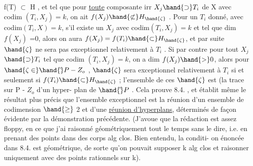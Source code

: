  f(T) $\subset$ H , et tel que pour \uline{toute} composante irr $X_j \hand{\supset} T_i$ de X
avec codim $(T_i,X_j)=k$, on ait $f(X_j)\hand{\not\subset} H_{\hand{\zeta}}$ . Pour un $T_i$ donné,
 avec codim$(T_i,X)=k$, s'il existe un $X_j$ avec codim$(T_i,X_j)=k$
et tel que dim $f(X_j)$ =0, alors 
 on aura $f(X_j) = f(T_i) \hand{\subset} H_{\hand{\zeta}}$, et par suite $\hand{\zeta}$ ne
sera pas exceptionnel relativement à $T_i$ . Si par contre pour tout $X_j$
$\hand{\supset} T_i$ tel que codim $(T_i,X_j) = k$, on a dim $f(X_j) \hand{>} 0$, alors pour
$\hand{\zeta \in} \hand{\check{}}P - Z_o$ , $\hand{\zeta}$ sera exceptionnel relativement à $T_i$ si et seulement si
$f(T_i) \hand{\subset} H_{\hand{\zeta}}$ ; l'ensemble de ces $\hand{\zeta}$ est (la trace sur P - $Z_o$\over{)}{\unsure{$\neq$}} d'\hand{)}un hyper-
plan de $\hand{\check{}}P$ . Cela prouve 8.4. , et établit même le résultat plus précis
que l'ensemble exceptionnel est la réunion d'un ensemble de codimension
$\hand{\geq}$ 2 et d'une \uline{réunion d'hyperplans}, déterminés de façon évidente par la
démonstration précédente. (J'avoue que la rédaction est assez floppy, \margin{\hand{|}}
en ce que j'ai raisonné géométriquement tout le temps sans le dire, i.e.
en prenant des points dans des corps alg clos. Bien entendu, la conditi-
on énoncée dans 8.4. est  géométrique, de sorte qu'on pouvait supposer
k alg clos et raisonner uniquement avec des points rationnels sur k).

 

